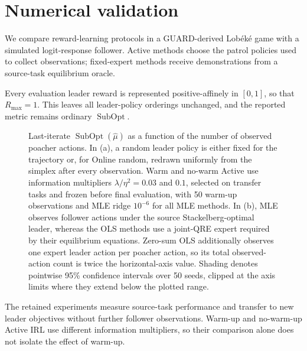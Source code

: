 \section{Numerical validation}

We compare reward-learning protocols in a GUARD-derived Lob\'ek\'e game with a
simulated logit-response follower. Active methods choose the patrol policies
used to collect observations; fixed-expert methods receive demonstrations from
a source-task equilibrium oracle.

Every evaluation leader reward is represented positive-affinely in $[0,1]$,
so that $R_{\max}=1$. This leaves all leader-policy orderings unchanged, and
the reported metric remains ordinary $\operatorname{SubOpt}$.

\begin{figure}[t]
  \centering
  \resizebox{\textwidth}{!}{%
  }
  \caption{Last-iterate $\operatorname{SubOpt}(\hat\mu)$ as a function of
  the number of observed poacher actions. In (a), a random leader policy is
  either fixed for the trajectory or, for Online random, redrawn uniformly from
  the simplex after every observation. Warm and no-warm Active use information
  multipliers $\lambda/\eta^2=0.03$ and $0.1$, selected on transfer tasks and
  frozen before final evaluation, with 50 warm-up observations and MLE ridge $10^{-6}$ for all MLE methods. In (b), MLE observes
  follower actions under the source Stackelberg-optimal leader, whereas the OLS
  methods use a joint-QRE expert required by their equilibrium equations.
  Zero-sum OLS additionally observes one expert leader action per poacher action,
  so its total observed-action count is twice the horizontal-axis value. Shading
  denotes pointwise 95\% confidence intervals over 50 seeds, clipped at the axis
  limits where they extend below the plotted range.}
  \label{fig:source-convergence}
\end{figure}

The retained experiments measure source-task performance and transfer to new
leader objectives without further follower observations. Warm-up and no-warm-up
Active IRL use different information multipliers, so their comparison alone
does not isolate the effect of warm-up.

